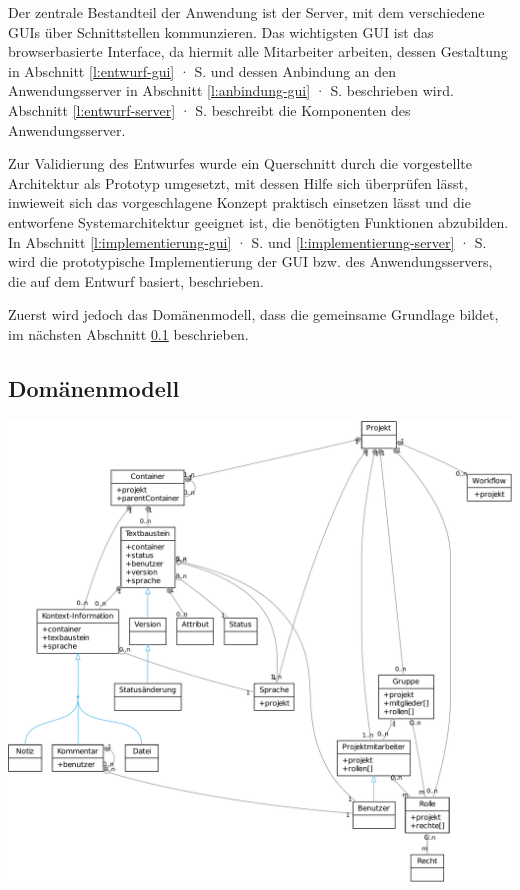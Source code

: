 Der zentrale Bestandteil der Anwendung ist der Server, mit dem verschiedene GUIs über Schnittstellen kommunzieren. Das wichtigsten GUI ist das browserbasierte Interface, da hiermit alle Mitarbeiter arbeiten, dessen Gestaltung in Abschnitt \ref{l:entwurf-gui} · S.\pageref{l:entwurf-gui} und dessen Anbindung an den Anwendungsserver in Abschnitt \ref{l:anbindung-gui} · S.\pageref{l:anbindung-gui} beschrieben wird. Abschnitt \ref{l:entwurf-server} · S.\pageref{l:entwurf-server} beschreibt die Komponenten des Anwendungsserver. 

Zur Validierung des Entwurfes wurde ein Querschnitt durch die vorgestellte Architektur als Prototyp umgesetzt, mit dessen Hilfe sich überprüfen lässt, inwieweit sich das vorgeschlagene Konzept praktisch einsetzen lässt und die entworfene Systemarchitektur geeignet ist, die benötigten Funktionen abzubilden. In Abschnitt \ref{l:implementierung-gui} · S.\pageref{l:implementierung-gui} und \ref{l:implementierung-server} · S.\pageref{l:implementierung-server} wird die prototypische Implementierung der GUI bzw. des Anwendungsservers, die auf dem Entwurf basiert, beschrieben.

Zuerst wird jedoch das Domänenmodell, dass die gemeinsame Grundlage bildet, im nächsten Abschnitt \ref{l:domänenmodell} beschrieben.

\pagebreak

\subsection{Domänenmodell}\label{l:domänenmodell}

\begin{center}
\includegraphics[width=\textwidth]{media/domain.pdf}
\label{chart:domain}
\end{center}

